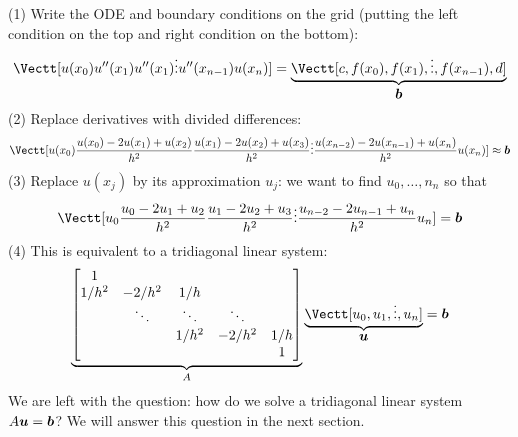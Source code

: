(1) Write the ODE and boundary conditions on the grid (putting the left condition on the top and right condition on the bottom):
\[
\Vectt[u(x_0) \\ 
u''(x_1) \\
u''(x_1) \\
\ensuremath{\vdots} \\
u''(x_{n-1}) \\
u(x_n)] = \underbrace{\Vectt[c, f(x_0), f(x_1), \ensuremath{\vdots} , f(x_{n-1}), d]}_{\ensuremath{\bm{\b}}}
\]
(2) Replace derivatives with divided differences:
\[
\Vectt[u(x_0) \\ 
{u(x_0) - 2u(x_1) + u(x_2)\over h^2} \\
{u(x_1) - 2u(x_2) + u(x_3)\over h^2} \\
\ensuremath{\vdots} \\
{u(x_{n-2}) - 2u(x_{n-1}) + u(x_n)\over h^2} \\
u(x_n)] \ensuremath{\approx} \ensuremath{\bm{\b}}
\]
(3) Replace $u(x_j)$  by its approximation $u_j$: we want to find $u_0,\ensuremath{\ldots},n_n$ so that
\[
\Vectt[u_0 \\ 
{u_0 - 2u_1 + u_2\over h^2} \\
{u_1 - 2u_2 + u_3\over h^2} \\
\ensuremath{\vdots} \\
{u_{n-2} - 2u_{n-1} + u_n\over h^2} \\
u_n] = \ensuremath{\bm{\b}}
\]
(4) This is equivalent to a tridiagonal linear system:
\[
\underbrace{\begin{bmatrix}
    1 \\ 
    1/h^2 & -2/h^2 & 1/h \\
    & \ensuremath{\ddots} & \ensuremath{\ddots} & \ensuremath{\ddots} \\
   && 1/h^2 & -2/h^2 & 1/h \\ 
   &&&& 1 \end{bmatrix}}_A \underbrace{\Vectt[u_0,u_1,\ensuremath{\vdots},u_n]}_{\ensuremath{\bm{\u}}} = \ensuremath{\bm{\b}}
\]
We are left with the question: how do we solve a tridiagonal linear system $A \bm{{\mbox{\boldmath$u$\unboldmath}}} = \bm{{\mbox{\boldmath$b$\unboldmath}}}$? We will answer this question in the next section.



